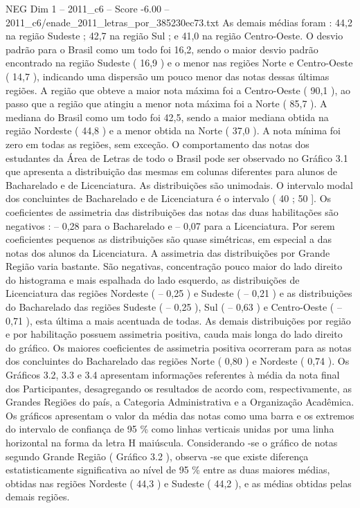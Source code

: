\begin{textsample}{NEG Dim 1 – 2011\_c6 – Score -6.00 – 2011\_c6/enade\_2011\_letras\_por\_385230ec73.txt}
As demais médias foram : 44,2 na região Sudeste ; 42,7 na região Sul ; e 41,0 na região Centro-Oeste.
O desvio padrão para o Brasil como um todo foi 16,2, sendo o maior desvio padrão encontrado na região Sudeste ( 16,9 ) e o menor nas regiões Norte e Centro-Oeste ( 14,7 ), indicando uma dispersão um pouco menor das notas dessas últimas regiões.
A região que obteve a maior nota máxima foi a Centro-Oeste ( 90,1 ), ao passo que a região que atingiu a menor nota máxima foi a Norte ( 85,7 ).
A mediana do Brasil como um todo foi 42,5, sendo a maior mediana obtida na região Nordeste ( 44,8 ) e a menor obtida na Norte ( 37,0 ).
A nota mínima foi zero em todas as regiões, sem exceção.
O comportamento das notas dos estudantes da Área de Letras de todo o Brasil pode ser observado no Gráfico 3.1 que apresenta a distribuição das mesmas em colunas diferentes para alunos de Bacharelado e de Licenciatura.
As distribuições são unimodais.
O intervalo modal dos concluintes de Bacharelado e de Licenciatura é o intervalo ( 40 ; 50 ].
Os coeficientes de assimetria das distribuições das notas das duas habilitações são negativos : – 0,28 para o Bacharelado e – 0,07 para a Licenciatura.
Por serem coeficientes pequenos as distribuições são quase simétricas, em especial a das notas dos alunos da Licenciatura.
A assimetria das distribuições por Grande Região varia bastante.
São negativas, concentração pouco maior do lado direito do histograma e mais espalhada do lado esquerdo, as distribuições de Licenciatura das regiões Nordeste ( – 0,25 ) e Sudeste ( – 0,21 ) e as distribuições do Bacharelado das regiões Sudeste ( – 0,25 ), Sul ( – 0,63 ) e Centro-Oeste ( – 0,71 ), esta última a mais acentuada de todas.
As demais distribuições por região e por habilitação possuem assimetria positiva, cauda mais longa do lado direito do gráfico.
Os maiores coeficientes de assimetria positiva ocorreram para as notas dos concluintes do Bacharelado das regiões Norte ( 0,80 ) e Nordeste ( 0,74 ).
Os Gráficos 3.2, 3.3 e 3.4 apresentam informações referentes à média da nota final dos Participantes, desagregando os resultados de acordo com, respectivamente, as Grandes Regiões do país, a Categoria Administrativa e a Organização Acadêmica.
Os gráficos apresentam o valor da média das notas como uma barra e os extremos do intervalo de confiança de 95 \% como linhas verticais unidas por uma linha horizontal na forma da letra H maiúscula.
Considerando -se o gráfico de notas segundo Grande Região ( Gráfico 3.2 ), observa -se que existe diferença estatisticamente significativa ao nível de 95 \% entre as duas maiores médias, obtidas nas regiões Nordeste ( 44,3 ) e Sudeste ( 44,2 ), e as médias obtidas pelas demais regiões.

\end{textsample}
